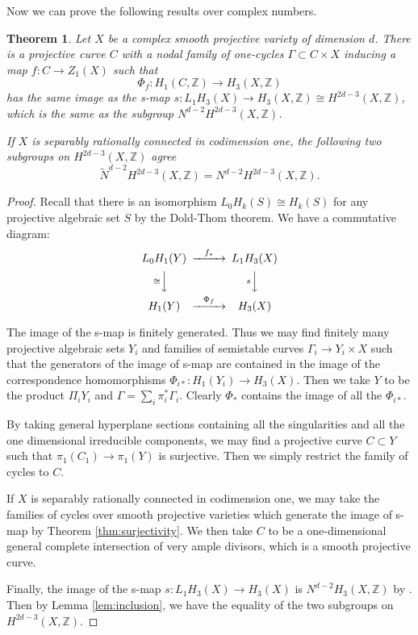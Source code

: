 \documentclass{amsart}
\newtheorem{thm}[theorem]{Theorem}
\theoremstyle{definition}
\theoremstyle{remark}
\newcommand{\mbb}{\mathbb}
\newcommand{\ZZ}{\mbb{Z}}
\begin{document}
Now we can prove the following results over complex numbers.

\begin{thm}\label{thm:image}
Let $X$ be a complex smooth projective variety of dimension $d$. 
There is a projective curve $C$ with a nodal family of one-cycles $\Gamma \subset C \times X$ inducing a map $f: C \to Z_1(X)$ such that
\[
\Phi_f: H_1(C, \ZZ) \to H_{3}(X, \ZZ) 
\]
has the same image as the s-map $s: L_1H_{3}(X) \to H_{3}(X, \ZZ)\cong H^{2d-3}(X, \ZZ)$, which is the same as the subgroup $N^{d-2}H^{2d-3}(X, \ZZ)$.

If $X$ is separably rationally connected in codimension one, the following two subgroups on $H^{2d-3}(X, \ZZ)$ agree
\[\tilde{N}^{d-2}H^{2d-3}(X, \ZZ)=N^{d-2}H^{2d-3}(X, \ZZ).\]
\end{thm}
\begin{proof}
Recall that there is an isomorphism $L_0H_k(S) \cong H_k(S)$ for any projective algebraic set $S$ by the Dold-Thom theorem.
We have a commutative diagram:
\[
\begin{CD}
L_0H_1(Y) @>f_*>> L_1H_3(X)\\
@V\cong VV @V s VV\\
H_1(Y) @>\Phi_f>> H_3(X)
\end{CD}
\]

The image of the s-map is finitely generated. Thus we may find finitely many  projective algebraic sets $Y_i$ and families of semistable curves $\Gamma_i \to Y_i \times X$ such that the generators of the image of s-map are contained in the image of the correspondence homomorphisms $\Phi_{i*}: H_1(Y_i) \to H_3(X)$.
Then we take $Y$ to be the product $\Pi_i Y_i$ and $\Gamma=\sum_i \pi_i^* \Gamma_i$.
Clearly $\Phi_*$ contains the image of all the $\Phi_{i*}$.

By taking general hyperplane sections containing   all the singularities and  all the one dimensional irreducible components, we may find a  projective curve $C \subset Y$ such that $\pi_1(C_1) \to \pi_1(Y)$ is surjective. Then we simply restrict the family of cycles to $C$. 

If $X$ is separably rationally connected in codimension one, we may take the families of cycles over smooth projective varieties which generate the image of s-map by Theorem \ref{thm:surjectivity}. 
We then take $C$ to be a one-dimensional general complete intersection of very ample divisors, which is a smooth projective curve.

Finally, the image of the s-map $s: L_1H_3(X) \to H_3(X)$ is $N^{d-2}H_3(X, \ZZ)$ by \cite[Proposition 2.8]{Walker_Morphic_AJ}. Then by Lemma \ref{lem:inclusion}, we have the equality of the two subgroups on $H^{2d-3}(X, \ZZ)$.
\end{proof}
\end{document}
